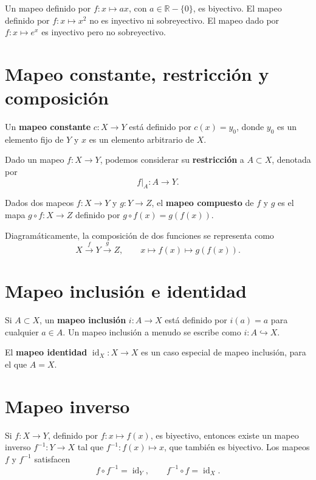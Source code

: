 \begin{ejemplo}
Un mapeo definido por $f : x \mapsto ax$, con $a \in \mathbb{R} - \{0\}$, es
biyectivo. El mapeo definido por $f : x \mapsto x^2$ no es inyectivo ni
sobreyectivo. El mapeo dado por $f : x \mapsto e^x$ es inyectivo pero no
sobreyectivo.
\end{ejemplo}

\section{Mapeo constante, restricción y composición}

\begin{definicion}
Un \textbf{mapeo constante} $c : X \to Y$ está definido por $c(x) = y_0$,
donde $y_0$ es un elemento fijo de $Y$ y $x$ es un elemento arbitrario de
$X$.

Dado un mapeo $f : X \to Y$, podemos considerar su \textbf{restricción} a
$A \subset X$, denotada por
\[
f|_A : A \to Y .
\]

Dados dos mapeos $f : X \to Y$ y $g : Y \to Z$, el \textbf{mapeo compuesto}
de $f$ y $g$ es el mapa $g \circ f : X \to Z$ definido por
$g \circ f (x) = g(f(x))$.
\end{definicion}

Diagramáticamente, la composición de dos funciones se representa como
\[
X \xrightarrow{\ f\ } Y \xrightarrow{\ g\ } Z, \qquad
x \mapsto f(x) \mapsto g(f(x)).
\]

\section{Mapeo inclusión e identidad}

\begin{definicion}
Si $A \subset X$, un \textbf{mapeo inclusión} $i : A \to X$ está definido
por $i(a) = a$ para cualquier $a \in A$. Un mapeo inclusión a menudo se
escribe como $i : A \hookrightarrow X$.

El \textbf{mapeo identidad} $\operatorname{id}_X : X \to X$ es un caso
especial de mapeo inclusión, para el que $A = X$.
\end{definicion}

\section{Mapeo inverso}

\begin{proposicionc}
Si $f : X \to Y$, definido por $f : x \mapsto f(x)$, es biyectivo, entonces
existe un mapeo inverso $f^{-1} : Y \to X$ tal que $f^{-1} : f(x) \mapsto x$,
que también es biyectivo. Los mapeos $f$ y $f^{-1}$ satisfacen
\[
f \circ f^{-1} = \operatorname{id}_Y, \qquad f^{-1} \circ f =
\operatorname{id}_X .
\]
\end{proposicionc}

